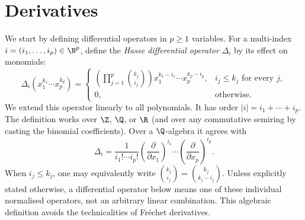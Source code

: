 \maketitle

\section{Derivatives}

We start by defining differential operators in $p\geq1$ variables.
For a multi-index $i=(i_1,\dots,i_p)\in\N^p$, define the \emph{Hasse differential operator}
$\Delta_i$ by its effect on monomials:
\[
\Delta_i(x_1^{k_1}\cdots x_p^{k_p})=
\begin{cases}
\displaystyle\left(\prod_{j=1}^p {k_j\choose i_j}\right)
 x_1^{k_1-i_1}\cdots x_p^{k_p-i_p},& i_j\leq k_j\text{ for every }j,\\[3pt]
0,&\text{otherwise}.
\end{cases}
\]
We extend this operator linearly to all polynomials. It has order
$|i|=i_1+\cdots+i_p$. The definition works over $\Z$, $\Q$, or $\R$
(and over any commutative semiring by casting the binomial coefficients).
Over a $\Q$-algebra it agrees with
\[
\Delta_i=\frac{1}{i_1!\cdots i_p!}
 \left(\frac{\partial}{\partial x_1}\right)^{i_1}\cdots
 \left(\frac{\partial}{\partial x_p}\right)^{i_p}.
\]
When $i_j\leq k_j$, one may equivalently write
${k_j\choose i_j}={k_j\choose k_j-i_j}$.
Unless explicitly stated otherwise, a differential operator below means one
of these individual normalised operators, not an arbitrary linear combination.
This algebraic definition avoids the technicalities of Fr\'echet derivatives.

